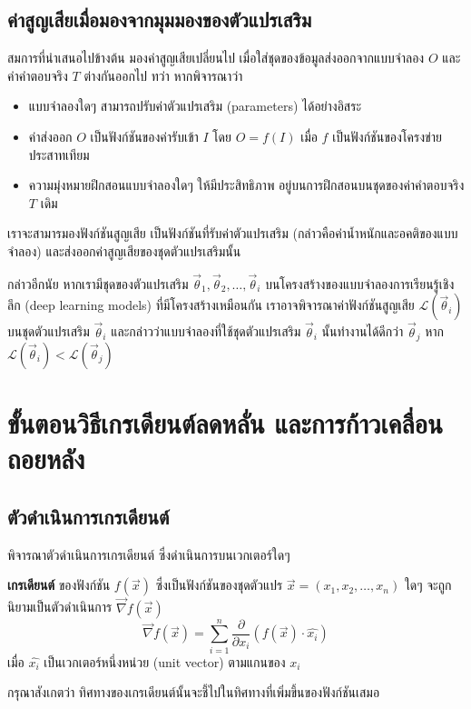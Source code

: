 \subsection{ค่าสูญเสียเมื่อมองจากมุมมองของตัวแปรเสริม}
สมการที่นำเสนอไปข้างต้น มองค่าสูญเสียเปลี่ยนไป เมื่อใส่ชุดของข้อมูลส่งออกจากแบบจำลอง $O$ และค่าคำตอบจริง $T$ ต่างกันออกไป ทว่า หากพิจารณาว่า
\begin{itemize}
    \item แบบจำลองใดๆ สามารถปรับค่าตัวแปรเสริม (parameters) ได้อย่างอิสระ
    \item ค่าส่งออก $O$ เป็นฟังก์ชันของค่ารับเข้า $I$ โดย $O = f(I)$ เมื่อ $f$ เป็นฟังก์ชันของโครงข่ายประสาทเทียม
    \item ความมุ่งหมายฝึกสอนแบบจำลองใดๆ ให้มีประสิทธิภาพ อยู่บนการฝึกสอนบนชุดของค่าคำตอบจริง $T$ เดิม
\end{itemize}
เราจะสามารมองฟังก์ชันสูญเสีย เป็นฟังก์ชันที่รับค่าตัวแปรเสริม (กล่าวคือค่าน้ำหนักและอคติของแบบจำลอง) และส่งออกค่าสูญเสียของชุดตัวแปรเสริมนั้น

กล่าวอีกนัย หากเรามีชุดของตัวแปรเสริม $\vec{\theta}_1, \vec{\theta}_2, \dots, \vec{\theta}_i$ บนโครงสร้างของแบบจำลองการเรียนรู้เชิงลึก (deep learning models) ที่มีโครงสร้างเหมือนกัน เราอาจพิจารณาค่าฟังก์ชันสูญเสีย $\mathscr{L}(\vec{\theta}_i)$ บนชุดตัวแปรเสริม $\vec{\theta}_i$ และกล่าวว่าแบบจำลองที่ใช้ชุดตัวแปรเสริม $\vec{\theta}_i$ นั้นทำงานได้ดีกว่า $\vec{\theta}_j$ หาก $\mathscr{L}(\vec{\theta}_i) < \mathscr{L}(\vec{\theta}_j)$ 

\section{ขั้นตอนวิธีเกรเดียนต์ลดหลั่น และการก้าวเคลื่อนถอยหลัง}

\subsection{ตัวดำเนินการเกรเดียนต์}

พิจารณาตัวดำเนินการเกรเดียนต์ ซึ่งดำเนินการบนเวกเตอร์ใดๆ

\begin{definition}
    \textbf{เกรเดียนต์} ของฟังก์ชัน $f(\vec{x})$ ซึ่งเป็นฟังก์ชันของชุดตัวแปร $\vec{x} = \left(x_1, x_2, \dots, x_n\right)$ ใดๆ จะถูกนิยามเป็นตัวดำเนินการ $\vec{\nabla}f\left(\vec{x}\right)$
    $$
        \vec{\nabla}f\left(\vec{x}\right) = \sum_{i=1}^{n} \frac{\partial}{\partial x_i} \left( f(\vec{x}) \cdot \hat{x_i} \right) 
    $$
    เมื่อ $\hat{x_i}$ เป็นเวกเตอร์หนึ่งหน่วย (unit vector) ตามแกนของ $x_i$
\end{definition}
กรุณาสังเกตว่า ทิศทางของเกรเดียนต์นั้นจะชี้ไปในทิศทางที่เพิ่มขึ้นของฟังก์ชันเสมอ

